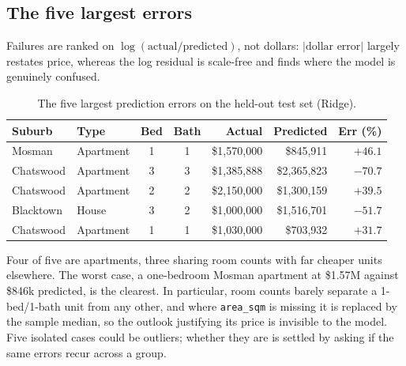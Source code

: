 \subsection{The five largest errors}

Failures are ranked on $\log(\text{actual}/\text{predicted})$, not dollars:
$|\text{dollar error}|$ largely restates price, whereas the log residual is scale-free
and finds where the model is genuinely confused.

\begin{table}[H]
\centering\small
\begin{tabular}{@{}l l c c r r r@{}}
\toprule
\textbf{Suburb} & \textbf{Type} & \textbf{Bed} & \textbf{Bath} & \textbf{Actual} & \textbf{Predicted} & \textbf{Err (\%)} \\
\midrule
Mosman    & Apartment & 1 & 1 & \$1{,}570{,}000 & \$845{,}911     & $+46.1$ \\
Chatswood & Apartment & 3 & 3 & \$1{,}385{,}888 & \$2{,}365{,}823 & $-70.7$ \\
Chatswood & Apartment & 2 & 2 & \$2{,}150{,}000 & \$1{,}300{,}159 & $+39.5$ \\
Blacktown & House     & 3 & 2 & \$1{,}000{,}000 & \$1{,}516{,}701 & $-51.7$ \\
Chatswood & Apartment & 1 & 1 & \$1{,}030{,}000 & \$703{,}932     & $+31.7$ \\
\bottomrule
\end{tabular}
\caption{The five largest prediction errors on the held-out test set (Ridge).}
\label{tab:worst}
\end{table}

Four of five are apartments, three sharing room counts with far cheaper units elsewhere.
The worst case, a one-bedroom Mosman apartment at \$1.57M against \$846k predicted, is
the clearest. In particular, room counts barely separate a 1-bed/1-bath unit from any other, and
where \texttt{area\_sqm} is missing it is replaced by the sample median, so the outlook
justifying its price is invisible to the model.
Five isolated cases could be outliers; whether they are is settled by asking if the same
errors recur across a group.

